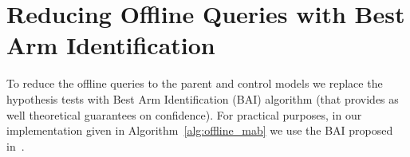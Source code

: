 \section{Reducing Offline Queries with Best Arm Identification}
\label{sec:appendix:offline_bai}
To reduce the offline queries to the parent and control models we replace the hypothesis tests with Best Arm Identification (BAI) algorithm (that provides as well theoretical guarantees on confidence). For practical purposes, in our implementation given in Algorithm~\ref{alg:offline_mab} we use the BAI proposed in~\cite{even2006action}. 

